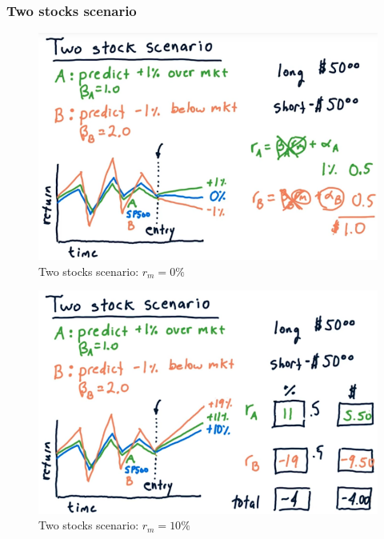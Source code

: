 \documentclass[12pt]{article}
\begin{document}
\subsubsection{Two stocks scenario}

\begin{figure}[!ht]
\centering
\includegraphics[scale=0.4]{fig/fig41}
\caption{Two stocks scenario: $r_m=0\%$}
\end{figure}

\begin{figure}[!ht]
\centering
\includegraphics[scale=0.4]{fig/fig42}
\caption{Two stocks scenario: $r_m=10\%$}
\end{figure}
\end{document}
